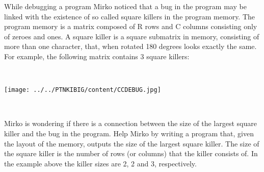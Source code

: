 While debugging a program Mirko noticed that a bug in the program may be linked with the existence of so called square killers in the program memory. The program memory is a matrix composed of R rows and C columns consisting only of zeroes and ones. A square killer is a square submatrix in memory, consisting of more than one character, that, when rotated 180 degrees looks exactly the same. For example, the following matrix contains 3 square killers:

 


\texttt{[image: ../../PTNKIBIG/content/CCDEBUG.jpg]}

 

Mirko is wondering if there is a connection between the size of the largest square killer and the bug in the program. Help Mirko by writing a program that, given the layout of the memory, outputs the size of the largest square killer. The size of the square killer is the number of rows (or columns) that the killer consists of. In the example above the killer sizes are 2, 2 and 3, respectively.